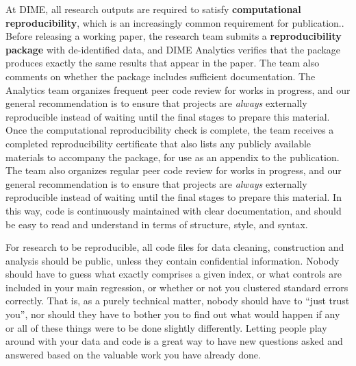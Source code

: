 At DIME, all research outputs are required to satisfy \textbf{computational reproducibility},
which is an increasingly common requirement for publication..
Before releasing a working paper,
the research team submits a \textbf{reproducibility package} with de-identified data,
and DIME Analytics verifies that the package produces
exactly the same results that appear in the paper.
The team also comments on whether the package includes sufficient documentation.
The Analytics team organizes frequent peer code review for works in progress,
and our general recommendation is to ensure that projects
are \textit{always} externally reproducible
instead of waiting until the final stages to prepare this material.
Once the computational reproducibility check is complete,
the team receives a completed reproducibility certificate
that also lists any publicly available materials to accompany the package,
for use as an appendix to the publication.
The team also organizes regular peer code review for works in progress,
and our general recommendation is to ensure that projects
are \textit{always} externally reproducible
instead of waiting until the final stages to prepare this material.
In this way, code is continuously maintained with clear documentation,
and should be easy to read and understand in terms of structure, style, and syntax.

For research to be reproducible,
all code files for data cleaning, construction and analysis
should be public, unless they contain confidential information.
Nobody should have to guess what exactly comprises a given index,
or what controls are included in your main regression,
or whether or not you clustered standard errors correctly.
That is, as a purely technical matter, nobody should have to ``just trust you'',
nor should they have to bother you to find out what would happen
if any or all of these things were to be done slightly differently.\cite{simonsohn2015specification}
Letting people play around with your data and code
is a great way to have new questions asked and answered
based on the valuable work you have already done.

